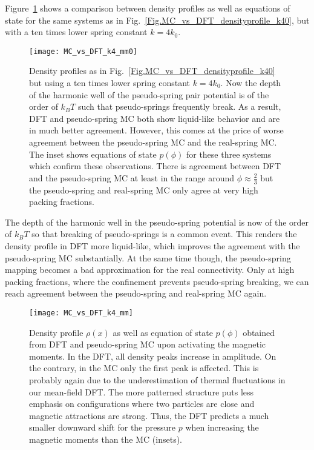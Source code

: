 \documentclass[aps,pre,twocolumn,superscriptaddress,nofootinbib]{revtex4}
\begin{document}
Figure~\ref{Fig.MC_vs_DFT_k4_mm0} shows a comparison between density profiles as well as equations of state for the same systems as in Fig.~\ref{Fig.MC_vs_DFT_densityprofile_k40}, but with a ten times lower spring constant $k = 4 k_0$. 
%
\begin{figure}
	\texttt{[image: MC\_vs\_DFT\_k4\_mm0]}
	\caption{Density profiles as in Fig.~\ref{Fig.MC_vs_DFT_densityprofile_k40} but using  a ten times lower spring constant $k = 4 k_0$. Now the depth of the harmonic well of the pseudo-spring pair potential is of the order of $k_BT$ such that pseudo-springs frequently break. As a result, DFT and pseudo-spring MC both show liquid-like behavior and are in much better agreement. However, this comes at the price of worse agreement between the  pseudo-spring MC and the real-spring MC. The inset shows equations of state  $p(\phi)$ for these three systems which confirm these observations. There is agreement between DFT and the pseudo-spring MC at least in the range around $\phi \approx \frac{2}{3}$ but the pseudo-spring and real-spring MC only agree at very high packing fractions.}
	\label{Fig.MC_vs_DFT_k4_mm0}
\end{figure}
%
The depth of the harmonic well in the pseudo-spring potential is now of the order of $k_BT$ so that breaking of pseudo-springs is a common event. 
This renders the density profile in DFT more liquid-like, which improves the agreement with the pseudo-spring MC substantially.
At the same time though, the pseudo-spring mapping becomes a bad approximation for the real connectivity. 
Only at high packing fractions, where the confinement prevents pseudo-spring breaking, we can reach agreement between the pseudo-spring and real-spring MC again.


%
\begin{figure*}[t]
	\texttt{[image: MC\_vs\_DFT\_k4\_mm]}
	\caption{Density profile $\rho(x)$ as well as equation of state $p(\phi)$ obtained from DFT and pseudo-spring MC upon activating the magnetic moments. In the DFT, all density peaks increase in amplitude. On the contrary, in the MC only the first peak is affected. This is probably again due to the underestimation of thermal fluctuations in our mean-field DFT. The more patterned structure puts less emphasis on configurations where two particles are close and magnetic attractions are strong. Thus, the DFT predicts a much smaller downward shift for the pressure $p$ when increasing the magnetic moments than the MC (insets).}
	\label{Fig.MC_vs_DFT_k4_mm}
\end{figure*}
%
\end{document}

